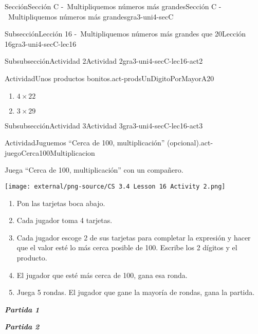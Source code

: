 \documentclass[twoside,14pt,]{extarticle}
\newcommand{\alert}[1]{\textbf{\textit{#1}}}
\begin{document}
\begin{sectionptx}{Sección}{Sección C -~Multipliquemos números más grandes}{}{Sección C -~Multipliquemos números más grandes}{}{}{gra3-uni4-secC}
\begin{subsectionptx}{Subsección}{Lección 16 -~Multipliquemos números más grandes que 20}{}{Lección 16}{}{}{gra3-uni4-secC-lec16}
\begin{subsubsectionptx}{Subsubsección}{Actividad 2}{}{Actividad 2}{}{}{gra3-uni4-secC-lec16-act2}
\begin{activity}{Actividad}{Unos productos bonitos.}{act-prodsUnDigitoPorMayorA20}
\begin{enumerate}
\begin{enumerate}
\item{}\(\displaystyle 4\times 22\)%
\item{}\(\displaystyle 3\times 29\)%
\end{enumerate}
\end{enumerate}
\end{activity}%
\end{subsubsectionptx}
%
%
\typeout{************************************************}
\typeout{************************************************}
%
\begin{subsubsectionptx}{Subsubsección}{Actividad 3}{}{Actividad 3}{}{}{gra3-uni4-secC-lec16-act3}
\begin{activity}{Actividad}{Juguemos “Cerca de 100, multiplicación” (opcional).}{act-juegoCerca100Multiplicacion}%
\begin{sidebyside}{2}{0.05}{0.05}{0.1}%
\begin{sbspanel}{0.5}%
Juega “Cerca de 100, multiplicación” con un compañero.%
\end{sbspanel}%
\begin{sbspanel}{0.3}%
\texttt{[image: external/png-source/CS 3.4 Lesson 16 Activity 2.png]}
\end{sbspanel}%
\end{sidebyside}%
%
\begin{enumerate}
\item{}Pon las tarjetas boca abajo.%
\item{}Cada jugador toma 4 tarjetas.%
\item{}Cada jugador escoge 2 de sus tarjetas para completar la expresión y hacer que el valor esté lo más cerca posible de 100. Escribe los 2 dígitos y el producto.%
\item{}El jugador que esté más cerca de 100, gana esa ronda.%
\item{}Juega 5 rondas. El jugador que gane la mayoría de rondas, gana la partida.%
\end{enumerate}
\begin{sidebyside}{2}{0}{0}{0.1}%
\begin{sbspanel}{0.45}%
\alert{Partida 1}%
\end{sbspanel}%
\begin{sbspanel}{0.45}%
\par
\alert{Partida 2}%
\end{sbspanel}%
\end{sidebyside}%
\begin{sidebyside}{2}{0}{0}{0.1}%

\end{sidebyside}
\end{activity}
\end{subsubsectionptx}
\end{subsectionptx}
\end{sectionptx}
\end{document}
